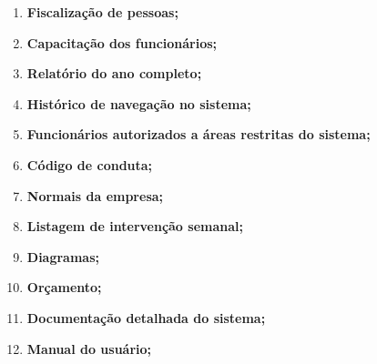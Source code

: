 \begin{enumerate}


      \item \textbf{Fiscalização de pessoas;}




      \item \textbf{Capacitação dos funcionários;}




      \item \textbf{Relatório do ano completo;}




      \item \textbf{Histórico de navegação no sistema;}




      \item \textbf{Funcionários autorizados a áreas restritas do sistema;}




      \item \textbf{Código de conduta;}




      \item \textbf{Normais da empresa;}




      \item \textbf{Listagem de intervenção semanal;}



      \item \textbf{Diagramas;}



      \item \textbf{Orçamento;}



      \item \textbf{Documentação detalhada do sistema;}



      \item \textbf{Manual do usuário;}




\end{enumerate}

